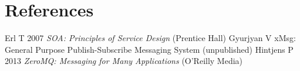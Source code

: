 \documentclass[a4paper]{jpconf}
\begin{document}
\section*{References}
\begin{thebibliography}{9}
   Erl T 2007 \textit{SOA: Principles of Service Design} (Prentice Hall)
   Gyurjyan V xMsg: General Purpose Publish-Subscribe Messaging System (unpublished)
   Hintjens P 2013 \textit{ZeroMQ: Messaging for Many Applications} (O'Reilly Media)
\end{thebibliography}
\end{document}
